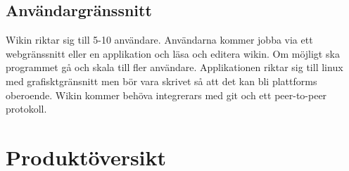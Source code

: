 \subsection{Användargränssnitt}
Wikin riktar sig till 5-10 användare. Användarna kommer jobba via ett webgränssnitt eller en applikation och läsa och editera wikin. Om möjligt ska programmet gå och skala till fler användare. Applikationen riktar sig till linux med grafisktgränsnitt men bör vara skrivet så att det kan bli plattforms oberoende. Wikin kommer behöva integrerars med git och ett peer-to-peer protokoll. 
\section{Produktöversikt}


